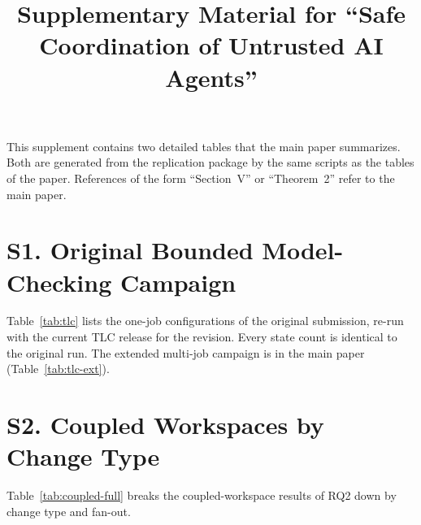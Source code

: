 \documentclass[lettersize,journal]{IEEEtran}
\begin{document}
\title{Supplementary Material for ``Safe Coordination of Untrusted AI Agents''}
\maketitle
This supplement contains two detailed tables that the main paper summarizes. Both are generated from the replication package by the same scripts as the tables of the paper. References of the form ``Section~V'' or ``Theorem~2'' refer to the main paper.

\section*{S1. Original Bounded Model-Checking Campaign}
Table~\ref{tab:tlc} lists the one-job configurations of the original submission, re-run with the current TLC release for the revision. Every state count is identical to the original run. The extended multi-job campaign is in the main paper (Table~\ref{tab:tlc-ext}).


\section*{S2. Coupled Workspaces by Change Type}
Table~\ref{tab:coupled-full} breaks the coupled-workspace results of RQ2 down by change type and fan-out.

\end{document}
